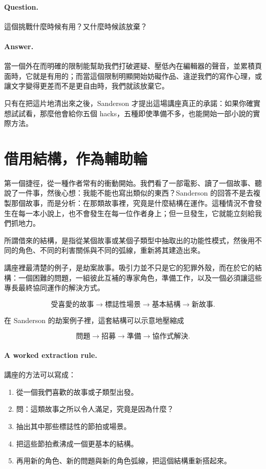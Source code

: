 \paragraph{Question.} 這個挑戰什麼時候有用？又什麼時候該放棄？

\paragraph{Answer.} 當一個外在而明確的限制能幫助我們打破遲疑、壓低內在編輯器的聲音，並累積頁面時，它就是有用的；而當這個限制明顯開始妨礙作品、違逆我們的寫作心理，或讓文字變得更差而不是更自由時，我們就該放棄它。

只有在把這片地清出來之後，Sanderson 才提出這場講座真正的承諾：如果你確實想試試看，那麼他會給你五個 hacks，五種即使準備不多，也能開始一部小說的實際方法。

\section{借用結構，作為輔助輪}

第一個捷徑，從一種作者常有的衝動開始。我們看了一部電影、讀了一個故事、聽說了一件事，然後心想：我能不能也寫出類似的東西？Sanderson 的回答不是去複製那個故事，而是分析：在那類故事裡，究竟是什麼結構在運作。這種情況不會發生在每一本小說上，也不會發生在每一位作者身上；但一旦發生，它就能立刻給我們抓地力。

\begin{definition}
所謂借來的結構，是指從某個故事或某個子類型中抽取出的功能性模式，然後用不同的角色、不同的利害關係與不同的弧線，重新將其建造出來。
\end{definition}

講座裡最清楚的例子，是劫案故事。吸引力並不只是它的犯罪外殼，而在於它的結構：一個困難的問題，一組彼此互補的專家角色，準備工作，以及一個必須讓這些專長最終協同運作的解決方式。

\begin{equation}
\text{受喜愛的故事} \to \text{標誌性場景} \to \text{基本結構} \to \text{新故事}.
\end{equation}

在 Sanderson 的劫案例子裡，這套結構可以示意地壓縮成

\begin{equation}
\text{問題} \to \text{招募} \to \text{準備} \to \text{協作式解決}.
\end{equation}

\paragraph{A worked extraction rule.} 講座的方法可以寫成：
\begin{enumerate}
\item 從一個我們喜歡的故事或子類型出發。
\item 問：這類故事之所以令人滿足，究竟是因為什麼？
\item 抽出其中那些標誌性的節拍或場景。
\item 把這些節拍煮沸成一個更基本的結構。
\item 再用新的角色、新的問題與新的角色弧線，把這個結構重新搭起來。
\end{enumerate}

